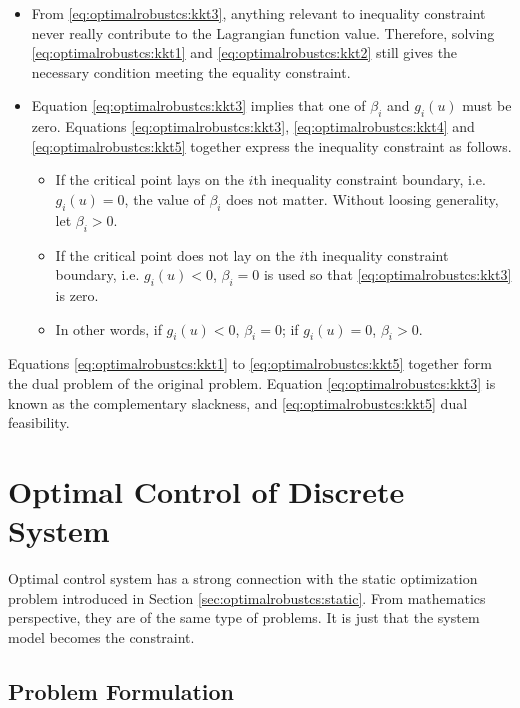 \begin{itemize}
  \item From \eqref{eq:optimalrobustcs:kkt3}, anything relevant to inequality constraint never really contribute to the Lagrangian function value. Therefore, solving \eqref{eq:optimalrobustcs:kkt1} and \eqref{eq:optimalrobustcs:kkt2} still gives the necessary condition meeting the equality constraint.
  \item Equation \eqref{eq:optimalrobustcs:kkt3} implies that one of $\beta_i$ and $g_i(u)$ must be zero. Equations \eqref{eq:optimalrobustcs:kkt3}, \eqref{eq:optimalrobustcs:kkt4} and \eqref{eq:optimalrobustcs:kkt5} together express the inequality constraint as follows.
  \begin{itemize}
    \item If the critical point lays on the $i$th inequality constraint boundary, i.e. $g_i(u)=0$, the value of $\beta_i$ does not matter. Without loosing generality, let $\beta_i>0$.
    \item If the critical point does not lay on the $i$th inequality constraint boundary, i.e. $g_i(u)<0$, $\beta_i=0$ is used so that \eqref{eq:optimalrobustcs:kkt3} is zero.
    \item In other words, if $g_i(u)<0$, $\beta_i=0$; if $g_i(u)=0$, $\beta_i>0$.
  \end{itemize}
\end{itemize}

Equations \eqref{eq:optimalrobustcs:kkt1} to \eqref{eq:optimalrobustcs:kkt5} together form the dual problem of the original problem. Equation \eqref{eq:optimalrobustcs:kkt3} is known as the complementary slackness, and \eqref{eq:optimalrobustcs:kkt5} dual feasibility.

\section{Optimal Control of Discrete System} \label{sec:optimalrobustcs:discrete}

Optimal control system has a strong connection with the static optimization problem introduced in Section \ref{sec:optimalrobustcs:static}. From mathematics perspective, they are of the same type of problems. It is just that the system model becomes the constraint.

\subsection{Problem Formulation}


